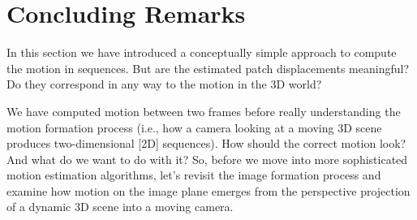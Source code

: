 







\section{Concluding Remarks}

In this section we have introduced a conceptually simple approach to compute the motion in sequences. But are the estimated patch displacements meaningful? Do they correspond in any way to the motion in the 3D world?

We have computed motion between two frames before really understanding the motion formation process (i.e., how a camera looking at a moving 3D scene produces two-dimensional [2D] sequences). How should the correct motion look? And what do we want to do with it?
So, before we move into more sophisticated motion estimation algorithms, let's revisit the image formation process and examine how motion on the image plane emerges from the perspective projection of a dynamic 3D scene into a moving camera.
